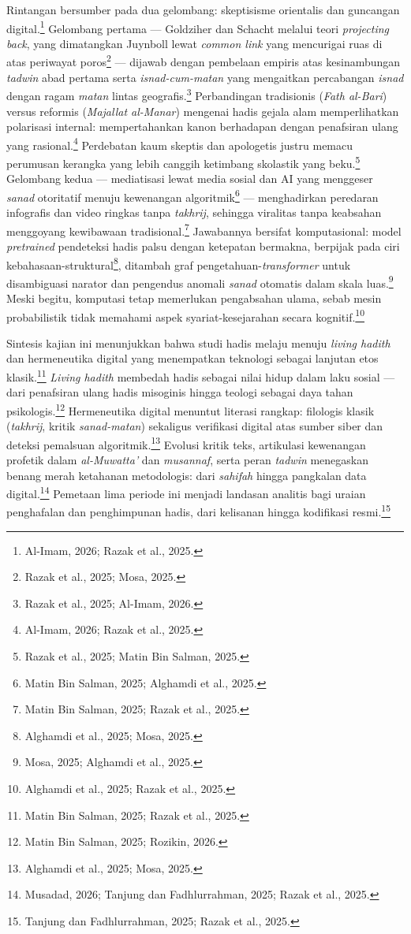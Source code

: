 Rintangan bersumber pada dua gelombang: skeptisisme orientalis dan guncangan digital.\footnote{Al-Imam, 2026; Razak et al., 2025.} Gelombang pertama --- Goldziher dan Schacht melalui teori \textit{projecting back}, yang dimatangkan Juynboll lewat \textit{common link} yang mencurigai ruas di atas periwayat poros\footnote{Razak et al., 2025; Mosa, 2025.} --- dijawab dengan pembelaan empiris atas kesinambungan \textit{tadwin} abad pertama serta \textit{isnad-cum-matan} yang mengaitkan percabangan \textit{isnad} dengan ragam \textit{matan} lintas geografis.\footnote{Razak et al., 2025; Al-Imam, 2026.} Perbandingan tradisionis (\textit{Fath al-Bari}) versus reformis (\textit{Majallat al-Manar}) mengenai hadis gejala alam memperlihatkan polarisasi internal: mempertahankan kanon berhadapan dengan penafsiran ulang yang rasional.\footnote{Al-Imam, 2026; Razak et al., 2025.} Perdebatan kaum skeptis dan apologetis justru memacu perumusan kerangka yang lebih canggih ketimbang skolastik yang beku.\footnote{Razak et al., 2025; Matin Bin Salman, 2025.} Gelombang kedua --- mediatisasi lewat media sosial dan AI yang menggeser \textit{sanad} otoritatif menuju kewenangan algoritmik\footnote{Matin Bin Salman, 2025; Alghamdi et al., 2025.} --- menghadirkan peredaran infografis dan video ringkas tanpa \textit{takhrij}, sehingga viralitas tanpa keabsahan menggoyang kewibawaan tradisional.\footnote{Matin Bin Salman, 2025; Razak et al., 2025.} Jawabannya bersifat komputasional: model \textit{pretrained} pendeteksi hadis palsu dengan ketepatan bermakna, berpijak pada ciri kebahasaan-struktural\footnote{Alghamdi et al., 2025; Mosa, 2025.}, ditambah graf pengetahuan-\textit{transformer} untuk disambiguasi narator dan pengendus anomali \textit{sanad} otomatis dalam skala luas.\footnote{Mosa, 2025; Alghamdi et al., 2025.} Meski begitu, komputasi tetap memerlukan pengabsahan ulama, sebab mesin probabilistik tidak memahami aspek syariat-kesejarahan secara kognitif.\footnote{Alghamdi et al., 2025; Razak et al., 2025.}

Sintesis kajian ini menunjukkan bahwa studi hadis melaju menuju \textit{living hadith} dan hermeneutika digital yang menempatkan teknologi sebagai lanjutan etos klasik.\footnote{Matin Bin Salman, 2025; Razak et al., 2025.} \textit{Living hadith} membedah hadis sebagai nilai hidup dalam laku sosial --- dari penafsiran ulang hadis misoginis hingga teologi sebagai daya tahan psikologis.\footnote{Matin Bin Salman, 2025; Rozikin, 2026.} Hermeneutika digital menuntut literasi rangkap: filologis klasik (\textit{takhrij}, kritik \textit{sanad-matan}) sekaligus verifikasi digital atas sumber siber dan deteksi pemalsuan algoritmik.\footnote{Alghamdi et al., 2025; Mosa, 2025.} Evolusi kritik teks, artikulasi kewenangan profetik dalam \textit{al-Muwatta'} dan \textit{musannaf}, serta peran \textit{tadwin} menegaskan benang merah ketahanan metodologis: dari \textit{sahifah} hingga pangkalan data digital.\footnote{Musadad, 2026; Tanjung dan Fadhlurrahman, 2025; Razak et al., 2025.} Pemetaan lima periode ini menjadi landasan analitis bagi uraian penghafalan dan penghimpunan hadis, dari kelisanan hingga kodifikasi resmi.\footnote{Tanjung dan Fadhlurrahman, 2025; Razak et al., 2025.}


